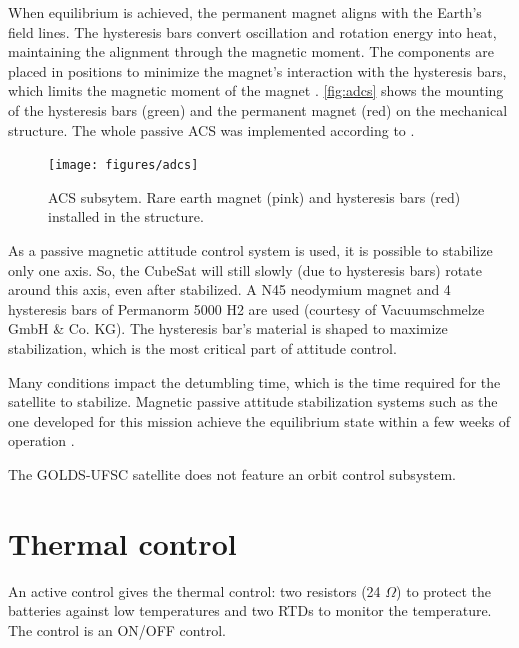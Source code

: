 When equilibrium is achieved, the permanent magnet aligns with the Earth's field lines. The hysteresis bars convert oscillation and rotation energy into heat, maintaining the alignment through the magnetic moment. The components are placed in positions to minimize the magnet's interaction with the hysteresis bars, which limits the magnetic moment of the magnet \cite{francois2010}. \autoref{fig:adcs} shows the mounting of the hysteresis bars (green) and the permanent magnet (red) on the mechanical structure. The whole passive ACS was implemented according to \cite{francois2010}.

\begin{figure}[!ht]
    \begin{center}
        \texttt{[image: figures/adcs]}
        \caption{ACS subsytem. Rare earth magnet (pink) and hysteresis bars (red) installed in the structure.}
        \label{fig:adcs}
    \end{center}
\end{figure}

As a passive magnetic attitude control system is used, it is possible to stabilize only one axis. So, the CubeSat will still slowly (due to hysteresis bars) rotate around this axis, even after stabilized. A N45 neodymium magnet and 4 hysteresis bars of Permanorm 5000 H2 are used (courtesy of Vacuumschmelze GmbH \& Co. KG). The hysteresis bar's material is shaped to maximize stabilization, which is the most critical part of attitude control.

Many conditions impact the detumbling time, which is the time required for the satellite to stabilize. Magnetic passive attitude stabilization systems such as the one developed for this mission achieve the equilibrium state within a few weeks of operation \cite{santoni2009}.

The GOLDS-UFSC satellite does not feature an orbit control subsystem.

\section{Thermal control}

An active control gives the thermal control: two resistors (24 $\Omega$) to protect the batteries against low temperatures and two RTDs to monitor the temperature. The control is an ON/OFF control.



